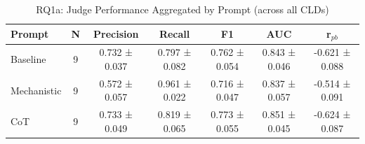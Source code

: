 \begin{table}[htbp]
\centering
\caption{RQ1a: Judge Performance Aggregated by Prompt (across all CLDs)}
\label{tab:rq1a_by_prompt}
\begin{tabular}{lcccccc}
\toprule
\textbf{Prompt} & \textbf{N} & \textbf{Precision} & \textbf{Recall} & \textbf{F1} & \textbf{AUC} & \textbf{r$_{pb}$} \\
\midrule
Baseline & 9 & 0.732 ± 0.037 & 0.797 ± 0.082 & 0.762 ± 0.054 & 0.843 ± 0.046 & -0.621 ± 0.088 \\
Mechanistic & 9 & 0.572 ± 0.057 & 0.961 ± 0.022 & 0.716 ± 0.047 & 0.837 ± 0.057 & -0.514 ± 0.091 \\
CoT & 9 & 0.733 ± 0.049 & 0.819 ± 0.065 & 0.773 ± 0.055 & 0.851 ± 0.045 & -0.624 ± 0.087 \\
\bottomrule
\end{tabular}
\end{table}
